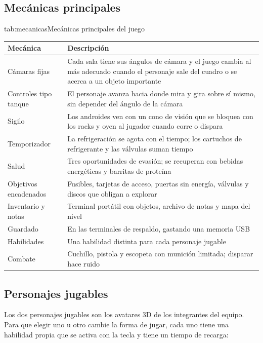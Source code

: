 \documentclass[stu,letterpaper,12pt,donotrepeattitle,floatsintext]{apa7}
\begin{document}
\subsection{Mecánicas principales}

\begin{TablaAPA}{tab:mecanicas}{Mecánicas principales del juego}
\begin{tabularx}{\linewidth}{P{4.2cm}L}
\toprule
Mecánica & Descripción \\
\midrule
Cámaras fijas & Cada sala tiene sus ángulos de cámara y el juego cambia al más adecuado cuando el personaje sale del cuadro o se acerca a un objeto importante \\
Controles tipo tanque & El personaje avanza hacia donde mira y gira sobre sí mismo, sin depender del ángulo de la cámara \\
Sigilo & Los androides ven con un cono de visión que se bloquea con los racks y oyen al jugador cuando corre o dispara \\
Temporizador & La refrigeración se agota con el tiempo; los cartuchos de refrigerante y las válvulas suman tiempo \\
Salud & Tres oportunidades de evasión; se recuperan con bebidas energéticas y barritas de proteína \\
Objetivos encadenados & Fusibles, tarjetas de acceso, puertas sin energía, válvulas y discos que obligan a explorar \\
Inventario y notas & Terminal portátil con objetos, archivo de notas y mapa del nivel \\
Guardado & En las terminales de respaldo, gastando una memoria USB \\
Habilidades & Una habilidad distinta para cada personaje jugable \\
Combate & Cuchillo, pistola y escopeta con munición limitada; disparar hace ruido \\
\bottomrule
\end{tabularx}
\end{TablaAPA}

\subsection{Personajes jugables}

Los dos personajes jugables son los avatares 3D de los integrantes del equipo. Para que elegir uno u
otro cambie la forma de jugar, cada uno tiene una habilidad propia que se activa con la tecla
 y tiene un tiempo de recarga:
\end{document}
